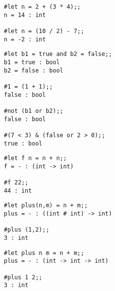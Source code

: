 
\begin{session}\begin{verbatim}
#let n = 2 + (3 * 4);;
n = 14 : int

#let n = (10 / 2) - 7;;
n = -2 : int
\end{verbatim}\end{session}



\begin{session}\begin{verbatim}
#let b1 = true and b2 = false;;
b1 = true : bool
b2 = false : bool

#1 = (1 + 1);;
false : bool

#not (b1 or b2);;
false : bool

#(7 < 3) & (false or 2 > 0);;
true : bool
\end{verbatim}\end{session}




\begin{session}\begin{verbatim}
#let f n = n + n;;
f = - : (int -> int)

#f 22;;
44 : int
\end{verbatim}\end{session}


\begin{session}\begin{verbatim}
#let plus(n,m) = n + m;;
plus = - : ((int # int) -> int)

#plus (1,2);;
3 : int
\end{verbatim}\end{session}




\begin{session}\begin{verbatim}
#let plus n m = n + m;;
plus = - : (int -> int -> int)

#plus 1 2;;
3 : int
\end{verbatim}\end{session}

